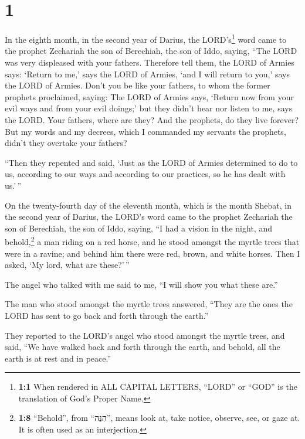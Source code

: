 \hypertarget{section}{%
\section{1}\label{section}}

 In the eighth month, in the second year of Darius, the
LORD's\footnote{\textbf{1:1} When rendered in ALL CAPITAL LETTERS,
  ``LORD'' or ``GOD'' is the translation of God's Proper Name.} word
came to the prophet Zechariah the son of Berechiah, the son of Iddo,
saying,  ``The LORD was very displeased with your fathers.
 Therefore tell them, the LORD of Armies says: `Return to
me,' says the LORD of Armies, `and I will return to you,' says the LORD
of Armies.  Don't you be like your fathers, to whom the
former prophets proclaimed, saying: The LORD of Armies says, `Return now
from your evil ways and from your evil doings;' but they didn't hear nor
listen to me, says the LORD.  Your fathers, where are
they? And the prophets, do they live forever?  But my
words and my decrees, which I commanded my servants the prophets, didn't
they overtake your fathers?

``Then they repented and said, `Just as the LORD of Armies determined to
do to us, according to our ways and according to our practices, so he
has dealt with us.'\,''

 On the twenty-fourth day of the eleventh month, which is
the month Shebat, in the second year of Darius, the LORD's word came to
the prophet Zechariah the son of Berechiah, the son of Iddo, saying,
 ``I had a vision in the night, and behold,\footnote{\textbf{1:8}
  ``Behold'', from ``הִנֵּה'', means look at, take notice, observe, see,
  or gaze at. It is often used as an interjection.} a man riding on a
red horse, and he stood amongst the myrtle trees that were in a ravine;
and behind him there were red, brown, and white horses. 
Then I asked, `My lord, what are these?'\,''

The angel who talked with me said to me, ``I will show you what these
are.''

 The man who stood amongst the myrtle trees answered,
``They are the ones the LORD has sent to go back and forth through the
earth.''

 They reported to the LORD's angel who stood amongst the
myrtle trees, and said, ``We have walked back and forth through the
earth, and behold, all the earth is at rest and in peace.''


